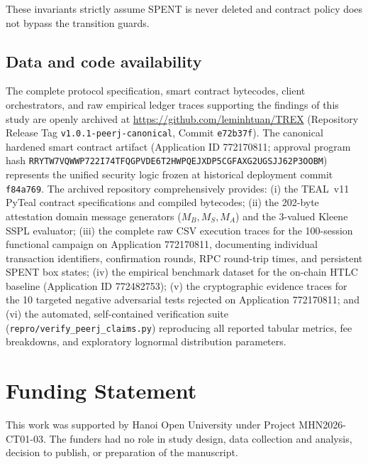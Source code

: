 \documentclass[fleqn,10pt,lineno]{wlpeerj}
\begin{document}
These invariants strictly assume SPENT is never deleted and contract policy does not bypass the transition guards.

\subsection*{Data and code availability}

The complete protocol specification, smart contract bytecodes, client orchestrators, and raw empirical ledger traces supporting the findings of this study are openly archived at \url{https://github.com/leminhtuan/TREX} (Repository Release Tag \texttt{v1.0.1-peerj-canonical}, Commit \texttt{e72b37f}). The canonical hardened smart contract artifact (Application ID 772170811; approval program hash \texttt{RRYTW7VQWWP722I74TFQGPVDE6T2HWPQEJXDP5CGFAXG2UGSJJ62P3OOBM}) represents the unified security logic frozen at historical deployment commit \texttt{f84a769}. The archived repository comprehensively provides: (i) the TEAL~v11 PyTeal contract specifications and compiled bytecodes; (ii) the 202-byte attestation domain message generators ($M_B, M_S, M_A$) and the 3-valued Kleene SSPL evaluator; (iii) the complete raw CSV execution traces for the 100-session functional campaign on Application 772170811, documenting individual transaction identifiers, confirmation rounds, RPC round-trip times, and persistent SPENT box states; (iv) the empirical benchmark dataset for the on-chain HTLC baseline (Application ID 772482753); (v) the cryptographic evidence traces for the 10 targeted negative adversarial tests rejected on Application 772170811; and (vi) the automated, self-contained verification suite (\texttt{repro/verify_peerj_claims.py}) reproducing all reported tabular metrics, fee breakdowns, and exploratory lognormal distribution parameters.

\section*{Funding Statement}

This work was supported by Hanoi Open University under Project MHN2026-CT01-03. The funders had no role in study design, data collection and analysis, decision to publish, or preparation of the manuscript.

\end{document}
